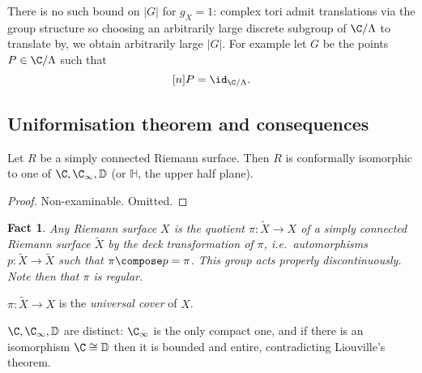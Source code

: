 \documentclass[a4paper]{article}
\newtheorem*{fact}{Fact}
\begin{document}
\begin{remark}
  There is no such bound on \(|G|\) for \(g_X = 1\): complex tori admit translations via the group structure so choosing an arbitrarily large discrete subgroup of \(\C/\Lambda\) to translate by, we obtain arbitrarily large \(|G|\). For example let \(G\) be the points \(P \in \C/\Lambda\) such that
  \[
    [n] P = \id_{\C/\Lambda}.
  \]
\end{remark}

\subsection{Uniformisation theorem and consequences}

\begin{theorem}
  Let \(R\) be a simply connected Riemann surface. Then \(R\) is conformally isomorphic to one of \(\C, \C_\infty, \mathbb D\) (or \(\mathbb H\), the upper half plane).
\end{theorem}

\begin{proof}
  Non-examinable. Omitted.
\end{proof}

\begin{fact}
  Any Riemann surface \(X\) is the quotient \(\pi: \tilde X \to X\) of a simply connected Riemann surface \(\tilde X\) by the deck transformation of \(\pi\), i.e.\ automorphisms \(p: \tilde X \to \tilde X\) such that \(\pi \compose p = \pi\). This group acts properly discontinuously. Note then that \(\pi\) is regular.
\end{fact}

\begin{definition}
  \(\pi: \tilde X \to X\) is the \emph{universal cover} of \(X\).
\end{definition}

\begin{remark}
  \(\C, \C_\infty, \mathbb D\) are distinct: \(\C_\infty\) is the only compact one, and if there is an isomorphism \(\C \cong \mathbb D\) then it is bounded and entire, contradicting Liouville's theorem.
\end{remark}
\end{document}
